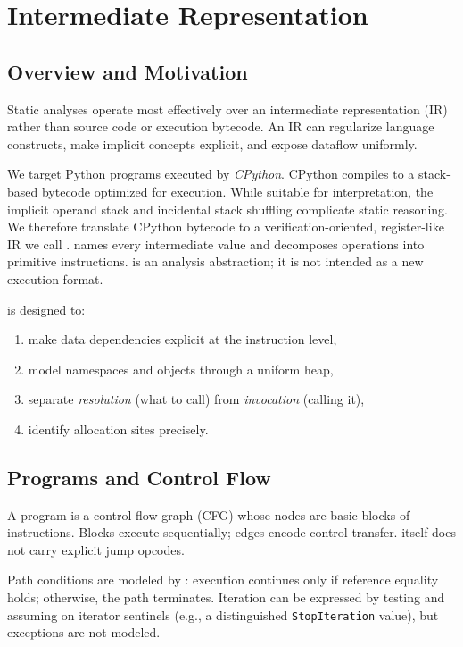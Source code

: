 \newpage
\section{\spytecode Intermediate Representation}
\label{sec:appendix-tac-ir}

\subsection{Overview and Motivation}

Static analyses operate most effectively over an intermediate representation (IR) rather than source code or execution bytecode. An IR can regularize language constructs, make implicit concepts explicit, and expose dataflow uniformly.

We target Python programs executed by \emph{CPython}. CPython compiles to a stack-based bytecode optimized for execution. While suitable for interpretation, the implicit operand stack and incidental stack shuffling complicate static reasoning. We therefore translate CPython bytecode to a verification-oriented, register-like IR we call \spytecode. \spytecode names every intermediate value and decomposes operations into primitive instructions. \spytecode is an analysis abstraction; it is not intended as a new execution format.

\spytecode is designed to:
\begin{enumerate}
\item make data dependencies explicit at the instruction level,
\item model namespaces and objects through a uniform heap,
\item separate \emph{resolution} (what to call) from \emph{invocation} (calling it),
\item identify allocation sites precisely.
\end{enumerate}

\subsection{Programs and Control Flow}

A \spytecode program is a control-flow graph (CFG) whose nodes are basic blocks of \spytecode instructions. Blocks execute sequentially; edges encode control transfer. \spytecode itself does not carry explicit jump opcodes.

Path conditions are modeled by \tAssumeEq: execution continues only if reference equality holds; otherwise, the path terminates. Iteration can be expressed by testing and assuming on iterator sentinels (e.g., a distinguished \texttt{StopIteration} value), but exceptions are not modeled.

